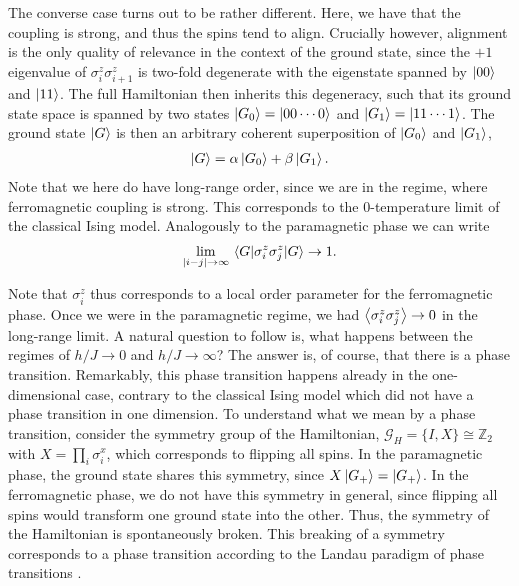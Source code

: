 The converse case turns out to be rather different. Here, we have that the
coupling is strong, and thus the spins tend to align. Crucially however,
alignment is the only quality of relevance in the context of the ground state,
since the $+1$ eigenvalue of $\sigma_i^z\sigma_{i+1}^z$ is two-fold degenerate
with the eigenstate spanned by $\ket{00}$ and $\ket{11}$. The full Hamiltonian
then inherits this degeneracy, such that its ground state space is spanned by
two states $\ket{G_0} = \ket{00\cdots 0}$ and $\ket{G_1} = \ket{11\cdots 1}$.
The ground state $\ket{G}$ is then an arbitrary coherent superposition of $\ket{G_0}$ and
$\ket{G_1}$,
\begin{align}
  \ket{G} = \alpha \ket{G_0} + \beta \ket{G_1}
.\end{align}
Note that we here do have long-range order, since we are in the
regime, where ferromagnetic coupling is strong. This corresponds to the
0-temperature limit of the classical Ising model. Analogously to the
paramagnetic phase we can write
\begin{align}
  \lim_{\abs{i-j}\to\infty} \expval{\sigma_i^z\sigma_j^z}{G} \to 1
.\end{align}

Note that $\sigma_i^z$ thus corresponds to a local order parameter for the
ferromagnetic phase. Once we were in the paramagnetic regime, we had
$\expval{\sigma_i^z\sigma_j^z}\to 0$ in the long-range limit. A natural
question to follow is, what happens between the regimes of
$h /J \to 0$ and $h /J \to \infty$? The answer is, of course, that there is a phase
transition. Remarkably, this phase transition happens already in the
one-dimensional case, contrary to the classical Ising model which did not have a phase
transition in one dimension. To understand what we mean by a phase 
transition, consider the symmetry group of the Hamiltonian, $\mathcal{G}_H =
\{I, X\} \cong \mathbb{Z}_2$ with $X = \prod_i \sigma_i^x$, which
corresponds to flipping all spins. In the paramagnetic phase, the ground state
shares this symmetry, since $X\ket{G_+} = \ket{G_+}$. In the ferromagnetic
phase, we do not have this symmetry in general, since flipping all spins would
transform one ground state into the other. Thus, the symmetry of the
Hamiltonian is spontaneously broken. This breaking of a symmetry corresponds to
a phase transition according to the Landau paradigm of phase transitions
\cite{landauTheoryPhaseTransitions1936}.

